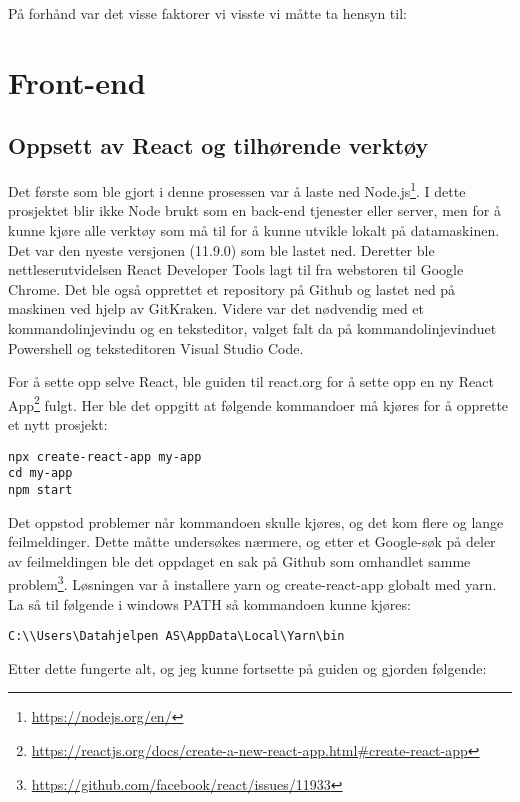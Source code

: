 \clearpage


På forhånd var det visse faktorer vi visste vi måtte ta hensyn til:


\section{Front-end}

\subsection{Oppsett av React og tilhørende verktøy}

Det første som ble gjort i denne prosessen var å laste ned Node.js\footnote{\url{https://nodejs.org/en/}}. I dette prosjektet blir ikke Node brukt som en back-end tjenester eller server, men for å kunne kjøre alle verktøy som må til for å kunne utvikle lokalt på datamaskinen. Det var den nyeste versjonen (11.9.0) som ble lastet ned. Deretter ble nettleserutvidelsen React Developer Tools lagt til fra  webstoren til Google Chrome. Det ble også opprettet et repository på Github og lastet ned på maskinen ved hjelp av GitKraken. 
Videre var det nødvendig med et kommandolinjevindu og en teksteditor, valget falt da på kommandolinjevinduet Powershell og teksteditoren Visual Studio Code.

For å sette opp selve React, ble  guiden til react.org for å sette opp en ny React App\footnote{\url{https://reactjs.org/docs/create-a-new-react-app.html\#create-react-app}} fulgt. Her ble det oppgitt at følgende kommandoer må kjøres for å opprette et nytt prosjekt:
\begin{lstlisting}
npx create-react-app my-app
cd my-app
npm start
\end{lstlisting}

Det oppstod problemer når kommandoen  skulle kjøres, og det kom flere og lange feilmeldinger. Dette måtte undersøkes nærmere, og etter et Google-søk på deler av feilmeldingen ble det oppdaget en sak på Github som omhandlet samme problem\footnote{\url{https://github.com/facebook/react/issues/11933}}.
Løsningen var å installere yarn og create-react-app globalt med yarn. La så til følgende i windows PATH så kommandoen kunne kjøres:
\begin{lstlisting}
C:\\Users\Datahjelpen AS\AppData\Local\Yarn\bin
\end{lstlisting}
Etter dette fungerte alt, og jeg kunne fortsette på guiden og gjorden følgende:

